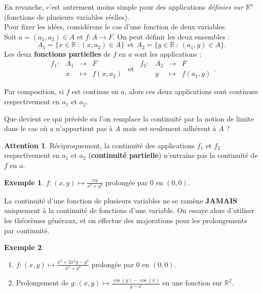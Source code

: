 \documentclass[french]{article}
\newcommand{\R}{\mathbb{R}}
\theoremstyle{plain}
\theoremstyle{definition}
\newtheorem*{ex}{Exemple}
\newtheorem*{attention}{Attention}
\theoremstyle{remark}
\begin{document}
En revanche, c'est autrement moins simple pour des applications \textit{définies sur $\R^n$} (fonctions de plusieurs variables réelles). \\
Pour fixer les idées, considérons le cas d'une fonction de deux variables.\\
Soit $a=(a_1,a_2)\in A$ et $f:A\to F$. On peut définir les deux ensembles : $$A_1=\{x\in\R\ : (x,a_2)\in A\}\ \ \text{et}\ \ A_2=\{y\in\R\ : \ (a_1,y)\in A\}.$$
Les deux \textbf{fonctions partielles} de $f$ en $a$ sont les applications : $$\begin{array}{lrcl}
	f_1:&A_1&\longrightarrow&F\\
	&x&\longmapsto&f(x,a_2)
\end{array}\ \ \text{et}\ \ 
\begin{array}{lrcl}
	f_2:&A_2&\longrightarrow&F\\
	&y&\longmapsto&f(a_1,y)
\end{array}.$$

Par composition, si $f$ est continue en $a$, alors ces deux applications sont continues respectivement en $a_1$ et $a_2$.

\begin{exo}
	Que devient ce qui précède su l'on remplace la continuité par la notion de limite dans le cas où $a$ n'appartient pas à $A$ mais est seulement adhérent à $A$ ?
\end{exo}

\begin{attention}
	Réciproquement, la continuité des applications $f_1$ et $f_2$ respectivement en $a_1$ et $a_2$ (\textbf{continuité partielle}) n'entraîne pas la continuité de $f$ en $a$.
\end{attention}

\begin{ex}
	$f:(x,y)\mapsto\displaystyle\frac{xy}{x^2+y^2}$ prolongée par $0$ en $(0,0)$.
\end{ex}

\begin{met}
	La continuité d'une fonction de plusieurs variables ne se ramène \textbf{JAMAIS} uniquement à la continuité de fonctions d'une variable. On essaye alors d'utiliser les théorèmes généraux, et on effectue des majorations pour les prolongements par continuité.
\end{met}

\begin{ex}
	\begin{enumerate}
		\item $f:(x,y)\mapsto\displaystyle\frac{x^3+2x^2y-y^3}{x^2+y^2}$ prolongée par $0$ en $(0,0)$.
		\item Prolongement de $g:(x,y)\mapsto\displaystyle\frac{\cos(y)-\cos(x)}{y-x}$ en une fonction sur $\R^2$. %
	\end{enumerate}
\end{ex}
\end{document}
